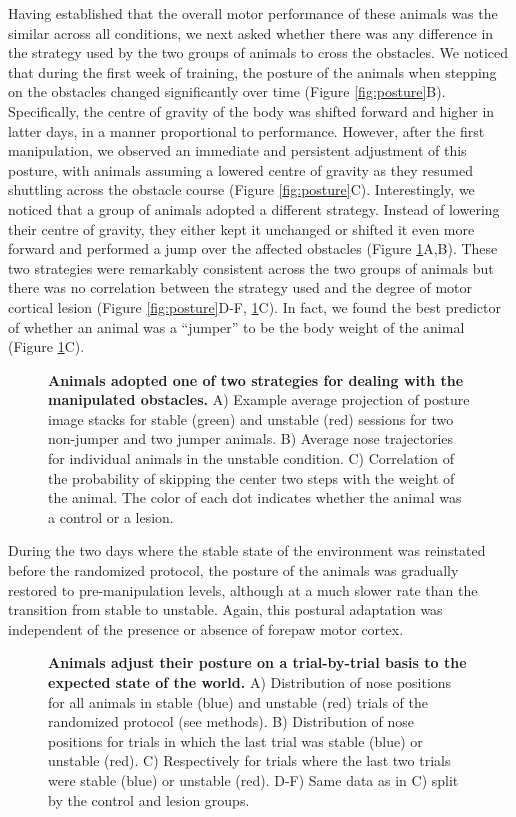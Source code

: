 Having established that the overall motor performance of these animals was the similar across all conditions, we next asked whether there was any difference in the strategy used by the two groups of animals to cross the obstacles. We noticed that during the first week of training, the posture of the animals when stepping on the obstacles changed significantly over time (Figure \ref{fig:posture}B). Specifically, the centre of gravity of the body was shifted forward and higher in latter days, in a manner proportional to performance. However, after the first manipulation, we observed an immediate and persistent adjustment of this posture, with animals assuming a lowered centre of gravity as they resumed shuttling across the obstacle course (Figure \ref{fig:posture}C). Interestingly, we noticed that a group of animals adopted a different strategy. Instead of lowering their centre of gravity, they either kept it unchanged or shifted it even more forward and performed a jump over the affected obstacles (Figure \ref{fig:jumping}A,B). These two strategies were remarkably consistent across the two groups of animals but there was no correlation between the strategy used and the degree of motor cortical lesion (Figure \ref{fig:posture}D-F, \ref{fig:jumping}C). In fact, we found the best predictor of whether an animal was a ``jumper'' to be the body weight of the animal (Figure \ref{fig:jumping}C).

\begin{figure}
\centering

\caption{\textbf{Animals adopted one of two strategies for dealing with the manipulated obstacles.} A) Example average projection of posture image stacks for stable (green) and unstable (red) sessions for two non-jumper and two jumper animals. B) Average nose trajectories for individual animals in the unstable condition. C) Correlation of the probability of skipping the center two steps with the weight of the animal. The color of each dot indicates whether the animal was a control or a lesion.}
\label{fig:jumping}
\end{figure}

During the two days where the stable state of the environment was reinstated before the randomized protocol, the posture of the animals was gradually restored to pre-manipulation levels, although at a much slower rate than the transition from stable to unstable. Again, this postural adaptation was independent of the presence or absence of forepaw motor cortex.

\begin{figure}
\centering

\caption{\textbf{Animals adjust their posture on a trial-by-trial basis to the expected state of the world.} A) Distribution of nose positions for all animals in stable (blue) and unstable (red) trials of the randomized protocol (see methods). B) Distribution of nose positions for trials in which the last trial was stable (blue) or unstable (red). C) Respectively for trials where the last two trials were stable (blue) or unstable (red). D-F) Same data as in C) split by the control and lesion groups.}
\label{fig:random}
\end{figure}

